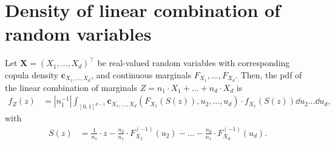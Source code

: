 \documentclass[11pt,a4paper,english]{article}
\begin{document}
\clearpage
%
\appendix
\section{Density of linear combination of random variables}
\label{sec:appendix}
\begin{proposition}
   Let $\bm{X} = (X_1, ..., X_d)^\top$ be real-valued random variables with corresponding
   copula density $\bm{c}_{X_1, ..., X_d}$, and continuous marginals $F_{X_1}, ..., F_{X_d}$.
   Then, the
   pdf of the linear combination of marginals $Z = n_1 \cdot X_1 +
   ... +  n_d \cdot X_d $ is
   \begin{align}
   f_Z(z) &= \left| n_1^{-1} \right| \int_{[0,1]^{d-1}} \bm{c}_{X_1,...,X_d}
      \left(F_{X_1} (S(z)), u_2, ..., u_d \right) \cdot
      f_{X_1} (S(z)) \dd u_2 ... \dd u_d, \label{density}
   \end{align}
   with
   \begin{align*}
      S(z) &= \frac{1}{n_1}\cdot z - \frac{n_2}{n_1} \cdot F^{(-1)}_{X_2}(u_2) - ... -  \frac{n_d}{n_1} \cdot F^{(-1)}_{X_d}(u_d).
      \end{align*}
   \end{proposition}
\end{document}
